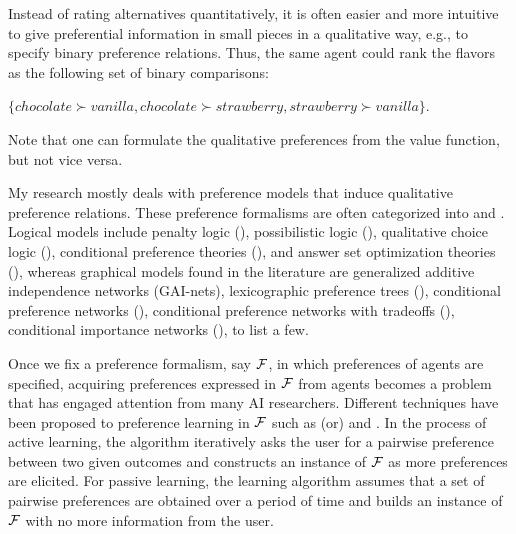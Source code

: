 Instead of rating alternatives quantitatively, it is
often easier and more intuitive to give preferential information
in small pieces in a qualitative way,
e.g., to specify binary preference relations.
Thus, the same agent could rank the flavors as the following
set of binary comparisons:
\begin{center}
	$\{chocolate \succ vanilla, chocolate \succ strawberry,
	strawberry \succ vanilla\}$.
\end{center}
Note that one can formulate the qualitative preferences from
the value function, but not vice versa.

My research mostly deals with preference models that induce
qualitative preference relations.
These preference formalisms are often categorized into  and
.
Logical models include penalty logic ()\cite{haddawy1992representations}, 
possibilistic logic ()\cite{DuboisLP91},
qualitative choice logic ()\cite{brewka2004qualitative},
conditional preference theories ()\cite{Wilson04extendingcp-nets},
and answer set optimization theories ()\cite{Brewka:ASO},
whereas graphical models found in the literature are
generalized additive independence networks (GAI-nets)\cite{BacchusG95,LIP61766},
lexicographic preference trees ()\cite{booth:learningLP,conf/adt13/LiuT},
conditional preference networks ()\cite{Kaci:Pref},
conditional preference networks with tradeoffs ()\cite{BrafmanD02:TCP},
conditional importance networks ()\cite{Kaci:Pref},
to list a few.

Once we fix a preference formalism, say $\mathcal{F}$, in which preferences of agents
are specified, acquiring preferences expressed in $\mathcal{F}$ from agents
becomes a problem that has engaged attention from many AI researchers.
Different techniques have been proposed to preference learning
in $\mathcal{F}$
such as  (or) and 
\cite{Furnkranz:pref_learning}.
In the process of
active learning, the algorithm iteratively asks the user for a pairwise 
preference between two given outcomes and constructs
an instance of $\mathcal{F}$ as more preferences are elicited.
For passive learning, the learning algorithm assumes that a set of
pairwise preferences are obtained over a period of time and builds an instance
of $\mathcal{F}$ with no more information from the user.

